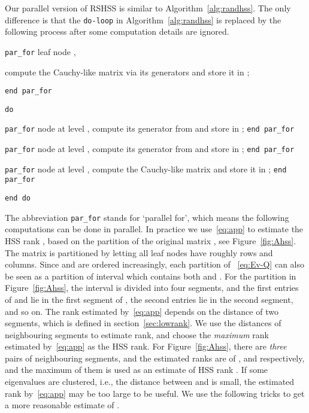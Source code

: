 \documentclass[times]{nlaauth}
\begin{document}
Our parallel version of RSHSS is similar to Algorithm~\ref{alg:randhss}.
The only difference is that the \texttt{do-loop} in Algorithm~\ref{alg:randhss} is replaced
by the following process after some computation details are ignored.

\begin{description}

\item \texttt{par\_for} leaf node ,
\item \hspace{0.5cm}  compute the Cauchy-like matrix  via its generators and store it in ;
\item \texttt{end par\_for}

\item \texttt{do} 
  \item \texttt{par\_for} node  at level , compute its generator  from   and
    store  in ; \texttt{end par\_for}

  \item \texttt{par\_for} node  at level , compute its generator  from   and
    store  in ; \texttt{end par\_for}

  \item \texttt{par\_for} node  at level , compute the Cauchy-like matrix  and
    store it in ; \texttt{end par\_for}

\item \texttt{end do}

\end{description}

The abbreviation \texttt{par\_for} stands for `parallel for', which means the following computations can be done in parallel.
In practice we use~\eqref{eq:app} to estimate the HSS rank ,
based on the partition of the original matrix , see Figure~\ref{fig:Ahss}.
The matrix  is partitioned by letting all leaf nodes have roughly  rows and columns.
Since  and  are ordered increasingly, each partition of ~\eqref{eq:Ev-Q} can also be seen as a
partition of interval  which contains both  and .
For the partition in Figure~\ref{fig:Ahss}, the interval   is divided into four segments, and
the first  entries of  and  lie in the first segment of ,
the second  entries lie in the second segment, and so on.
The rank estimated by~\eqref{eq:app} depends on the distance of two segments, which is defined in section~\ref{sec:lowrank}.
We use the distances of neighbouring segments to estimate rank, and choose the \emph{maximum} rank estimated
by~\eqref{eq:app} as the HSS rank.
For Figure~\ref{fig:Ahss}, there are \emph{three} pairs of neighbouring segments, and
the estimated ranks are of ,  and  respectively, and
the maximum of them is used as an estimate of HSS rank .
If some eigenvalues are clustered, i.e., the distance between  and  is small,
the estimated rank by~\eqref{eq:app} may be too large to be useful.
We use the following tricks to get a more reasonable estimate of .
\end{document}
